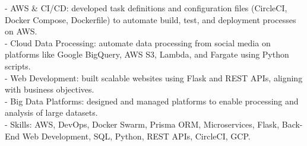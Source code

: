 \documentclass[
	a4paper,
]{fortysecondscv}
\begin{document}
\begin{cvtable}[3]
{    - AWS \& CI/CD: developed task definitions and configuration files (CircleCI, Docker Compose, Dockerfile) to automate build, test, and deployment processes on AWS.\\
    - Cloud Data Processing: automate data processing from social media on platforms like Google BigQuery, AWS S3, Lambda, and Fargate using Python scripts.\\
    - Web Development: built scalable websites using Flask and REST APIs, aligning with business objectives.\\
    - Big Data Platforms: designed and managed platforms to enable processing and analysis of large datasets.\\
    - Skills: AWS, DevOps, Docker Swarm, Prisma ORM, Microservices, Flask, Back-End Web Development, SQL, Python, REST APIs, CircleCI, GCP.}
\end{cvtable}








\end{document}
